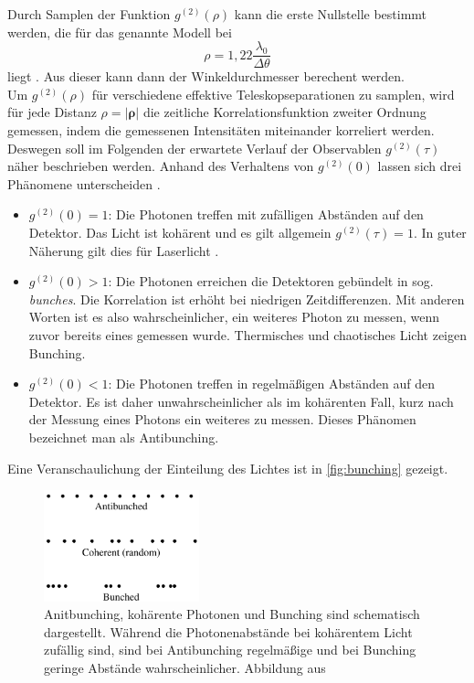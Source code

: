 Durch Samplen der Funktion $g^{(2)}(\rho)$ kann die erste Nullstelle bestimmt werden, die für das genannte Modell bei 
\begin{equation}
    \rho=1{,}22\frac{\lambda_0}{\Delta\theta} 
    \label{eq:erste nulstelle von g2(rho) für lochblende}
\end{equation}
liegt \cite[Kap. 4.1]{brownIntensityInterferometerIts1974}. 
Aus dieser kann dann der Winkeldurchmesser berechent werden. \\


Um $g^{(2)}(\rho)$ für verschiedene effektive Teleskopseparationen zu samplen, wird für jede Distanz $\rho=|\bm{\rho}|$ die zeitliche Korrelationsfunktion zweiter Ordnung gemessen, indem die gemessenen Intensitäten miteinander korreliert werden. 
Deswegen soll im Folgenden der erwartete Verlauf der Observablen $g^{(2)}(\tau)$ näher beschrieben werden. 
Anhand des Verhaltens von $g^{(2)}(0)$ lassen sich drei Phänomene unterscheiden \cite{foxQuantumOpticsIntroduction2006}. 
\begin{itemize}
    \item $g^{(2)}(0)=1$: Die Photonen treffen mit zufälligen Abständen auf den Detektor. Das Licht ist kohärent und es gilt allgemein $g^{(2)}(\tau)=1$. In guter Näherung gilt dies für Laserlicht \cite[Kap. 9]{mansuripurClassicalOpticsIts2009}.
    \item $g^{(2)}(0)>1$: Die Photonen erreichen die Detektoren gebündelt in sog. \emph{bunches}. Die Korrelation ist erhöht bei niedrigen Zeitdifferenzen. Mit anderen Worten ist es also wahrscheinlicher, ein weiteres Photon zu messen, wenn zuvor bereits eines gemessen wurde. Thermisches und chaotisches Licht zeigen Bunching.
    \item $g^{(2)}(0)<1$: Die Photonen treffen in regelmäßigen Abständen auf den Detektor. Es ist daher unwahrscheinlicher als im kohärenten Fall, kurz nach der Messung eines Photons ein weiteres zu messen. Dieses Phänomen bezeichnet man als Antibunching. 
\end{itemize}
Eine Veranschaulichung der Einteilung des Lichtes ist in \autoref{fig:bunching} gezeigt. 
\begin{figure}[h]
    \centering
    \includegraphics[width=0.4\textwidth]{images/Theorie/Fox_6.6.png}
    \caption{Anitbunching, kohärente Photonen und Bunching sind schematisch dargestellt. Während die Photonenabstände bei kohärentem Licht zufällig sind, sind bei Antibunching regelmäßige und bei Bunching geringe Abstände wahrscheinlicher. Abbildung aus \cite[Fig. 6.6]{foxQuantumOpticsIntroduction2006}}
    \label{fig:bunching}
\end{figure}

